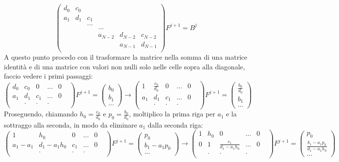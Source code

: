 \documentclass[]{article}
\newcommand{\lr}[3]{\ensuremath{\left#1 #3 \right#2}}
\newcommand{\lrt}[1]{\lr{(}{)}{#1}}
\numberwithin{equation}{subsection}
\begin{document}
\begin{equation}
\lrt{\begin{array}{cccccc}
d_0&c_0&&&\\
a_1&d_1&c_1&\\
&&...&&&\\
&&&...&&\\
&&&a_{N-2}&d_{N-2}&c_{N-2}\\
&&&&a_{N-1}&d_{N-1}\\
\end{array}} F^{j+1} = 
B^j
\end{equation}
A questo punto procedo con il trasformare la matrice nella somma di una matrice identit\`a e di una matrice con valori non nulli solo nelle celle sopra alla diagonale, faccio vedere i primi passaggi:
\begin{equation}
\lrt{\begin{array}{cccccc}
d_0&c_0&0&...&0\\
a_1&d_1&c_1&...&0\\
&.&.&.&&\\
\end{array}} F^{j+1} = \lrt{\begin{array}{c}
b_0\\b_1\\...
\end{array}}\to
\lrt{\begin{array}{cccccc}
1&\frac{c_0}{d_0}&0&...&0\\
a_1&d_1&c_1&...&0\\
&.&.&.&&\\
\end{array}} F^{j+1} = \lrt{\begin{array}{c}
\frac{b_0}{d_0}\\b_1\\...
\end{array}}
\end{equation}
Proseguendo, chiamando $h_0 = \frac{c_0}{d_0}$ e $p_0 = \frac{b_0}{d_0}$, moltiplico la prima riga per $a_1$ e la sottraggo alla seconda, in modo da eliminare $a_1$ dalla seconda riga:
\begin{equation}
\lrt{\begin{array}{cccccc}
1&h_0&0&...&0\\
a_1-a_1 &d_1 -a_1 h_0&c_1&...&0\\
&.&.&.&&\\
\end{array}} F^{j+1} = \lrt{\begin{array}{c}
p_0\\b_1-a_1p_0\\...
\end{array}}\to
\lrt{\begin{array}{cccccc}
1&h_0&0&...&0\\
0 &1&\frac{c_1}{d_1 -a_1 h_0}&...&0\\
&.&.&.&&\\
\end{array}} F^{j+1} = \lrt{\begin{array}{c}
p_0\\\frac{b_1-a_1p_0}{d_1 -a_1 h_0}\\...
\end{array}}
\end{equation}
\end{document}
